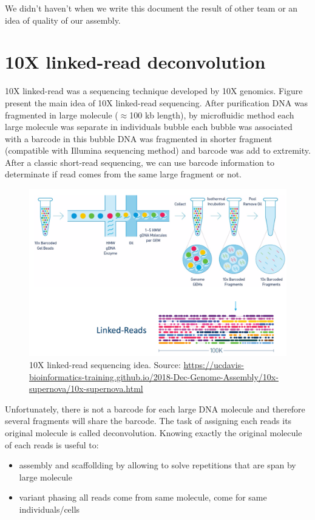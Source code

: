 \documentclass[main.tex]{subfiles}
\begin{document}
We didn't haven't when we write this document the result of other team or an idea of quality of our assembly.

\section{10X linked-read deconvolution} \label{section:other_contribution:10x}

10X linked-read was a sequencing technique developed by 10X genomics. Figure \label{fig:other_contribution:10x} present the main idea of 10X linked-read sequencing. After purification DNA was fragmented in large molecule ($\approx$100 kb length), by microfluidic method each large molecule was separate in individuals bubble each bubble was associated with a barcode in this bubble DNA was fragmented in shorter fragment (compatible with Illumina sequencing method) and barcode was add to extremity. After a classic short-read sequencing, we can use barcode information to determinate if read comes from the same large fragment or not.

\begin{figure}
    \centering
    \includegraphics[width=\textwidth]{other_contribution/images/Linked_reads.png}
    \caption{10X linked-read sequencing idea. Source: \url{https://ucdavis-bioinformatics-training.github.io/2018-Dec-Genome-Assembly/10x-supernova/10x-supernova.html}}
    \label{fig:other_contribution:10x}
\end{figure}

Unfortunately, there is not a barcode for each large DNA molecule and therefore several fragments will share the barcode. The task of assigning each reads its original molecule is called deconvolution. Knowing exactly the original molecule of each reads is useful to: 
\begin{itemize}
    \item assembly and scaffollding by allowing to solve repetitions that are span by large molecule
    \item variant phasing all reads come from same molecule, come for same individuals/cells
\end{itemize}
 
\end{document}
